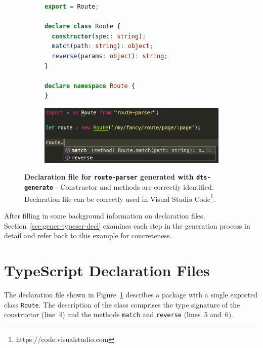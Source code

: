 \documentclass[a4paper,english,cleveref, autoref]{lipics-v2019}
\newcommand{\figref}[1]{Figure~\ref{#1}}
\begin{document}
\begin{figure}[tp]
  \centering
  \begin{subfigure}{0.70\linewidth}
    \begin{lstlisting}[language=TypeScript]
export = Route;

declare class Route {
  constructor(spec: string);
  match(path: string): object;
  reverse(params: object): string;
}

declare namespace Route {
}
    \end{lstlisting}
  \end{subfigure}

  \hspace{10.\textwidth}

  \begin{subfigure}{1.\linewidth}
    \centering
    \includegraphics[width=0.7\linewidth]{motivating-example-route-parser-vscode.png}
  \end{subfigure}

  \caption{\textbf{Declaration file for \texttt{route-parser} generated with \texttt{dts-generate}} - Constructor and methods are correctly identified. Declaration file can be correctly used in Visual Studio Code\footnote{https://code.visualstudio.com}.}
  \label{fig:motivating-example-route-parser-vscode}
\end{figure}

After filling in some background information on declaration files,
Section~\ref{sec:gener-typescr-decl} examines each step in the
generation process in detail and refer back to this example for
concreteness.

\section{TypeScript Declaration Files}
\label{sec:typescr-decl-files}

The declaration file shown in
\figref{fig:motivating-example-route-parser-vscode} describes a
package with a single exported class \lstinline{Route}. The
description of the class comprises the type signature of the
constructor (line~4) and the methods \lstinline{match} and
\lstinline{reverse} (lines~5 and~6).
\end{document}
